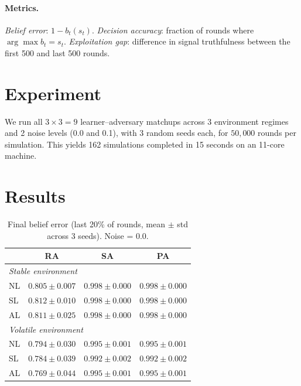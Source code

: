 \documentclass[11pt,letterpaper]{article}
\begin{document}
\paragraph{Metrics.}
\emph{Belief error}: $1 - b_t(s_t)$.
\emph{Decision accuracy}: fraction of rounds where
$\arg\max b_t = s_t$.
\emph{Exploitation gap}: difference in signal truthfulness between
the first 500 and last 500 rounds.

\section{Experiment}

We run all $3 \times 3 = 9$ learner--adversary matchups across 3
environment regimes and 2 noise levels (0.0 and 0.1), with 3 random
seeds each, for $50{,}000$ rounds per simulation.  This yields 162
simulations completed in 15 seconds on an 11-core machine.

\section{Results}

\begin{table}[h]
\centering
\caption{Final belief error (last 20\% of rounds, mean $\pm$ std across 3 seeds).
Noise = 0.0.}
\label{tab:belief_error}
\begin{tabular}{lccc}
\toprule
& \textbf{RA} & \textbf{SA} & \textbf{PA} \\
\midrule
\multicolumn{4}{l}{\emph{Stable environment}} \\
NL & $0.805 \pm 0.007$ & $0.998 \pm 0.000$ & $0.998 \pm 0.000$ \\
SL & $0.812 \pm 0.010$ & $0.998 \pm 0.000$ & $0.998 \pm 0.000$ \\
AL & $0.811 \pm 0.025$ & $0.998 \pm 0.000$ & $0.998 \pm 0.000$ \\
\midrule
\multicolumn{4}{l}{\emph{Volatile environment}} \\
NL & $0.794 \pm 0.030$ & $0.995 \pm 0.001$ & $0.995 \pm 0.001$ \\
SL & $0.784 \pm 0.039$ & $\mathbf{0.992 \pm 0.002}$ & $0.992 \pm 0.002$ \\
AL & $\mathbf{0.769 \pm 0.044}$ & $0.995 \pm 0.001$ & $0.995 \pm 0.001$ \\
\bottomrule
\end{tabular}
\end{table}
\end{document}
